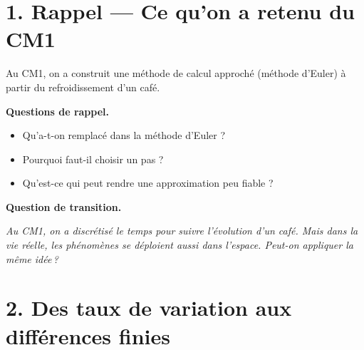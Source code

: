 \section*{1. Rappel --- Ce qu'on a retenu du CM1}

Au CM1, on a construit une méthode de calcul approché
(méthode d'Euler) à partir du refroidissement d'un café.

\medskip

\textbf{Questions de rappel.}
\begin{itemize}[leftmargin=*]
  \item Qu'a-t-on remplacé dans la méthode d'Euler ?
  \item Pourquoi faut-il choisir un pas ?
  \item Qu'est-ce qui peut rendre une approximation peu fiable ?
\end{itemize}


\medskip

\textbf{Question de transition.}

\begin{center}
\begin{mdframed}[backgroundcolor=ThemeLight, linecolor=Theme,
  linewidth=1pt, innertopmargin=8pt, innerbottommargin=8pt]
\centering\itshape
\og Au CM1, on a discrétisé le temps
pour suivre l'évolution d'un café.
Mais dans la vie réelle, les phénomènes
se déploient aussi dans l'espace.
Peut-on appliquer la même idée\,?\fg{}
\end{mdframed}
\end{center}

\section*{2. Des taux de variation aux différences finies}

